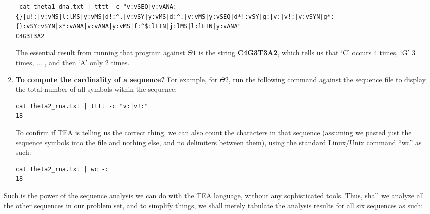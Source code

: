 \documentclass[a4paper, 18pt]{book} %
\begin{document}
\begin{enumerate}
{\begin{verbatim}
 cat theta1_dna.txt | tttt -c "v:vSEQ|v:vANA:{}|u!:|v:vMS|l:lMS|y:vMS|d!:^.|v:vSY|y:vMS|d:^.|v:vMS|y:vSEQ|d*!:vSY|g:|v:|v!:|v:vSYN|g*:{}:vSY:vSYN|x*:vANA|v:vANA|y:vMS|f:^$:lFIN|j:lMS|l:lFIN|y:vANA"
C4G3T3A2
\end{verbatim}

The essential result from running that program against $\Theta1$ is the string \textbf{C4G3T3A2}, which tells us that `C' occurs 4 times, `G' 3 times, ... , and then `A' only 2 times. 
}
\item {\textbf{To compute the cardinality of a sequence?} For example, for $\Theta2$, run the following command against the sequence file to display the total number of all symbols within the sequence:

\begin{verbatim}
cat theta2_rna.txt | tttt -c "v:|v!:"
18
\end{verbatim}

To confirm if TEA is telling us the correct thing, we can also count the characters in that sequence (assuming we pasted just the sequence symbols into the file and nothing else, and no delimiters between them), using the standard Linux/Unix command ``wc'' as such:

\begin{verbatim}
cat theta2_rna.txt | wc -c
18
\end{verbatim}

}
\end{enumerate}


Such is the power of the sequence analysis we can do with the TEA language, without any sophisticated tools. Thus, shall we analyze all the other sequences in our problem set, and to simplify things, we shall merely tabulate the analysis results for all six sequences as such:
\end{document}
